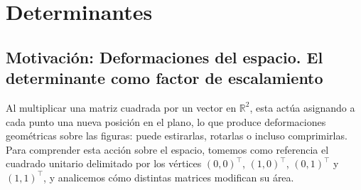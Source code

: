 \documentclass[compacto,10pt]{pubciencias-notas}
\begin{document}
\encabezado

\vspace*{-8mm}

\setcounter{section}{2}
\section{Determinantes}
\subsection{Motivación: Deformaciones del espacio. El determinante como factor de escalamiento}

Al multiplicar una matriz cuadrada por un vector en $\mathbb{R}^2$, esta actúa asignando a cada punto una nueva posición en el plano, lo que produce deformaciones geométricas sobre las figuras: puede estirarlas, rotarlas o incluso comprimirlas. Para comprender esta acción sobre el espacio, tomemos como referencia el cuadrado unitario delimitado por los vértices $(0,0)^{\top}$, $(1,0)^{\top}$, $(0,1)^{\top}$ y $(1,1)^{\top}$, y analicemos cómo distintas matrices modifican su área.
\end{document}
